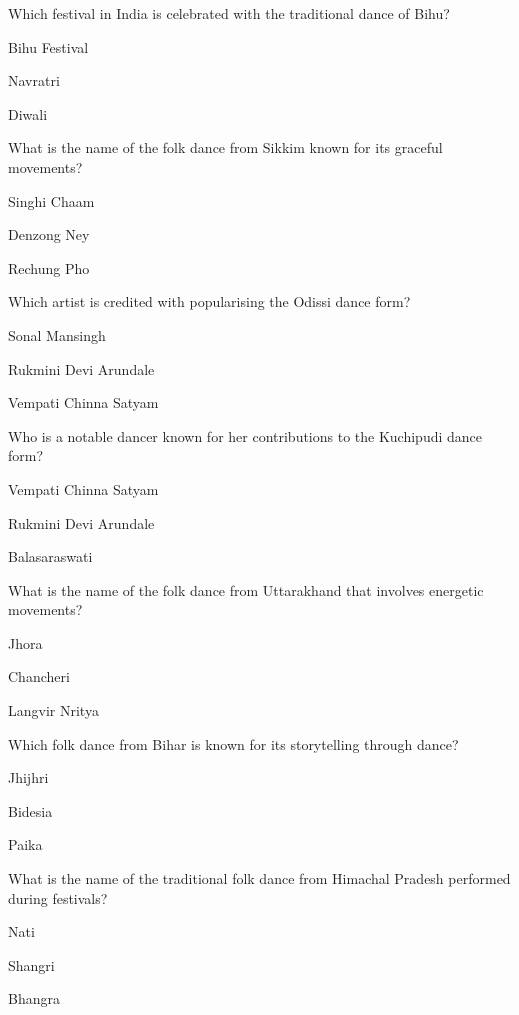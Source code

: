 \begin{enhancedmcq}{Which festival in India is celebrated with the traditional dance of Bihu?}
\item Bihu Festival
\item Navratri
\item Diwali

\end{enhancedmcq}
\begin{enhancedmcq}{What is the name of the folk dance from Sikkim known for its graceful movements?}
\item Singhi Chaam
\item Denzong Ney
\item Rechung Pho

\end{enhancedmcq}
\begin{enhancedmcq}{Which artist is credited with popularising the Odissi dance form?}
\item Sonal Mansingh
\item Rukmini Devi Arundale
\item Vempati Chinna Satyam

\end{enhancedmcq}
\begin{enhancedmcq}{Who is a notable dancer known for her contributions to the Kuchipudi dance form?}
\item Vempati Chinna Satyam
\item Rukmini Devi Arundale
\item Balasaraswati

\end{enhancedmcq}
\begin{enhancedmcq}{What is the name of the folk dance from Uttarakhand that involves energetic movements?}
\item Jhora
\item Chancheri
\item Langvir Nritya

\end{enhancedmcq}
\begin{enhancedmcq}{Which folk dance from Bihar is known for its storytelling through dance?}
\item Jhijhri
\item Bidesia
\item Paika

\end{enhancedmcq}
\begin{enhancedmcq}{What is the name of the traditional folk dance from Himachal Pradesh performed during festivals?}
\item Nati
\item Shangri
\item Bhangra

\end{enhancedmcq}
